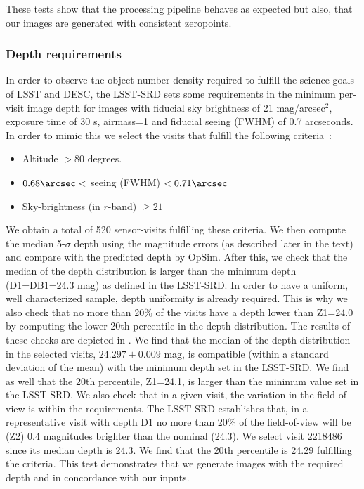 \documentclass[\docopts]{\docclass}
\begin{document}
These tests show that the processing pipeline behaves as expected but also, that our images are generated with consistent zeropoints.

\subsubsection{Depth requirements}
\label{sssec:depth}
In order to observe the object number density required to fulfill the science goals of LSST and DESC, the LSST-SRD sets some requirements in the minimum per-visit image depth for images with fiducial sky brightness of 21 mag/arcsec$^2$, exposure time of 30 s, airmass=1 and fiducial seeing (FWHM) of 0.7 arcseconds. In order to mimic this we select the visits that fulfill the following criteria~\citep{LPM-17}:
\begin{itemize}
\item Altitude $> 80$ degrees.
\item $0.68\arcsec <$ seeing (FWHM) $ < 0.71\arcsec$
\item Sky-brightness (in $r$-band) $ \geq 21$ 
\end{itemize}
We obtain a total of 520 sensor-visits fulfilling these criteria. We then compute the median 5-$\sigma$ depth  using the magnitude errors (as described later in the text) and compare with the predicted depth by OpSim. After this, we check that the median of the depth distribution is larger than the minimum depth (D1=DB1=24.3 mag) as defined in the LSST-SRD. In order to have a uniform, well characterized sample, depth uniformity is already required. This is why we also check that no more than 20\% of the visits have a depth lower than Z1=24.0 by computing the lower 20th percentile in the depth distribution. The results of these checks are depicted in . We find that the median of the depth distribution in the selected visits, $24.297 \pm 0.009$ mag, is compatible (within a standard deviation of the mean) with the minimum depth set in the LSST-SRD. We find as well that the 20th percentile, Z1=24.1, is larger than the minimum value set in the LSST-SRD. We also check that in a given visit, the variation in the field-of-view is within the requirements. The LSST-SRD establishes that, in a representative visit with depth D1 no more than 20\% of the field-of-view will be (Z2) 0.4 magnitudes brighter than the nominal (24.3). We select visit 2218486 since its median depth is 24.3. We find that the 20th percentile is 24.29 fulfilling the criteria. This test demonstrates that we generate images with the required depth and in concordance with our inputs.
\end{document}
